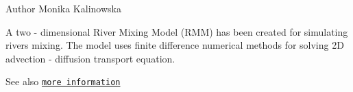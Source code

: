 \begin{DoxyAuthor}{Author}
Monika Kalinowska
\end{DoxyAuthor}
A two -\/ dimensional River Mixing Model (RMM) has been created for simulating rivers mixing. The model uses finite difference numerical methods for solving 2D advection -\/ diffusion transport equation. \begin{DoxySeeAlso}{See also}
\href{http://www.igf.edu.pl/~mkalinow/Monika/model.php}{\tt more information} 
\end{DoxySeeAlso}
